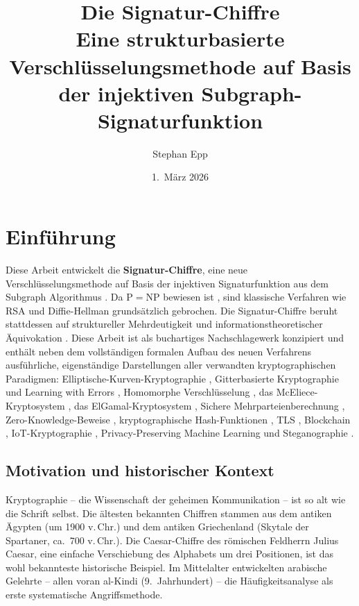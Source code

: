 ﻿\documentclass[a4paper,12pt]{scrreprt}
\title{\textbf{Die Signatur-Chiffre}\\[0.8ex]
\large Eine strukturbasierte Verschlüsselungsmethode auf Basis\\
der injektiven Subgraph-Signaturfunktion}
\author{Stephan Epp}
\date{1.\ März 2026}
\theoremstyle{definition}
\begin{document}
\maketitle

\tableofcontents
\newpage

\section{Einführung}

Diese Arbeit entwickelt die \textbf{Signatur-Chiffre}, eine neue Verschlüsselungsmethode auf Basis der injektiven Signaturfunktion aus dem Subgraph Algorithmus \cite{Epp26a}. Da $\mathrm{P}=\mathrm{NP}$ bewiesen ist \cite{Epp26a}, sind klassische Verfahren wie RSA \cite{Riv78} und Diffie-Hellman \cite{DH76} grundsätzlich gebrochen. Die Signatur-Chiffre beruht stattdessen auf struktureller Mehrdeutigkeit und informationstheoretischer Äquivokation \cite{Sha49}. Diese Arbeit ist als buchartiges Nachschlagewerk konzipiert und enthält neben dem vollständigen formalen Aufbau des neuen Verfahrens ausführliche, eigenständige Darstellungen aller verwandten kryptographischen Paradigmen: Elliptische-Kurven-Kryptographie \cite{Kob87,Mil86}, Gitterbasierte Kryptographie und Learning with Errors \cite{Reg05,LPR10}, Homomorphe Verschlüsselung \cite{Gen09,BGV12,CKKS17}, das McEliece-Kryptosystem \cite{McE78}, das ElGamal-Kryptosystem \cite{ElG85}, Sichere Mehrparteienberechnung \cite{Yao82,GMW87}, Zero-Knowledge-Beweise \cite{GMR89,BFM88}, kryptographische Hash-Funktionen \cite{Dam89,Mer89}, TLS \cite{Res18}, Blockchain \cite{Nak08}, IoT-Kryptographie \cite{BSW07}, Privacy-Preserving Machine Learning \cite{GLP+21} und Steganographie \cite{Cox97}.

\subsection{Motivation und historischer Kontext}

Kryptographie -- die Wissenschaft der geheimen Kommunikation -- ist so alt wie die Schrift selbst. Die ältesten bekannten Chiffren stammen aus dem antiken Ägypten (um 1900 v.\,Chr.) und dem antiken Griechenland (Skytale der Spartaner, ca.\ 700 v.\,Chr.). Die Caesar-Chiffre des römischen Feldherrn Julius Caesar, eine einfache Verschiebung des Alphabets um drei Positionen, ist das wohl bekannteste historische Beispiel. Im Mittelalter entwickelten arabische Gelehrte -- allen voran al-Kindi (9.\ Jahrhundert) -- die Häufigkeitsanalyse als erste systematische Angriffsmethode.
\end{document}
